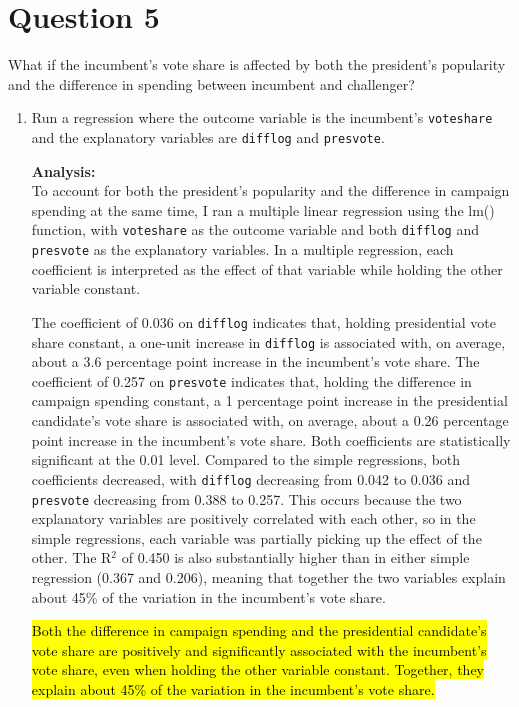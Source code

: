 \documentclass[12pt,letterpaper]{article}
\begin{document}
	\newpage	

\section*{Question 5}
\noindent What if the incumbent's vote share is affected by both the president's popularity and the difference in spending between incumbent and challenger? 
	\begin{enumerate}
		\item Run a regression where the outcome variable is the incumbent's \texttt{voteshare} and the explanatory variables are \texttt{difflog} and \texttt{presvote}.	
		
		
		
		
		\textbf{Analysis:}\\
		To account for both the president's popularity and the difference in campaign spending at the same time, I ran a multiple linear regression using the lm() function, with \texttt{voteshare} as the outcome variable and both \texttt{difflog} and \texttt{presvote} as the explanatory variables. In a multiple regression, each coefficient is interpreted as the effect of that variable while holding the other variable constant.
		
		The coefficient of 0.036 on \texttt{difflog} indicates that, holding presidential vote share constant, a one-unit increase in \texttt{difflog} is associated with, on average, about a 3.6 percentage point increase in the incumbent's vote share. The coefficient of 0.257 on \texttt{presvote} indicates that, holding the difference in campaign spending constant, a 1 percentage point increase in the presidential candidate's vote share is associated with, on average, about a 0.26 percentage point increase in the incumbent's vote share. Both coefficients are statistically significant at the 0.01 level. Compared to the simple regressions, both coefficients decreased, with \texttt{difflog} decreasing from 0.042 to 0.036 and \texttt{presvote} decreasing from 0.388 to 0.257. This occurs because the two explanatory variables are positively correlated with each other, so in the simple regressions, each variable was partially picking up the effect of the other. The R$^2$ of 0.450 is also substantially higher than in either simple regression (0.367 and 0.206), meaning that together the two variables explain about 45\% of the variation in the incumbent's vote share.
		
		\hl{Both the difference in campaign spending and the presidential candidate's vote share are positively and significantly associated with the incumbent’s vote share, even when holding the other variable constant. Together, they explain about 45\% of the variation in the incumbent's vote share.}
		

\end{enumerate}
\end{document}
